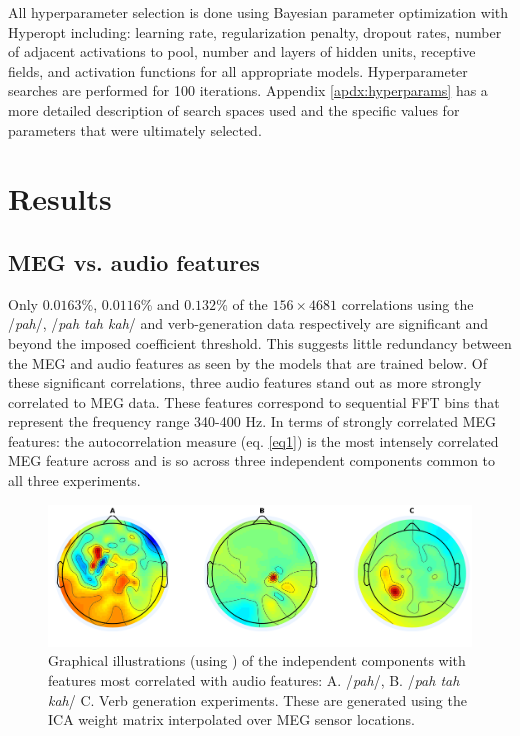 \documentclass[utf8]{frontiersSCNS} %
\begin{document}
All hyperparameter selection is done using Bayesian parameter optimization with Hyperopt \cite{Bergstra2013} including: learning rate, regularization penalty, dropout rates, number of adjacent activations to pool, number and layers of hidden units, receptive fields, and activation functions for all appropriate models. Hyperparameter searches are performed for 100 iterations. Appendix \ref{apdx:hyperparams} has a more detailed description of search spaces used and the specific values for parameters that were ultimately selected.

\section{Results}

\subsection{MEG vs. audio features}

Only $0.0163$\%, $0.0116$\% and $0.132$\% of the $156 \times 4681$ correlations using the /{\em pah}/, /{\em pah tah kah}/ and verb-generation data respectively are significant and beyond the imposed coefficient threshold. This suggests little redundancy between the MEG and audio features as seen by the models that are trained below. Of these significant correlations, three audio features stand out as more strongly correlated to MEG data. These features correspond to sequential FFT bins that represent the frequency range 340-400 Hz. In terms of strongly correlated MEG features: the autocorrelation measure (eq. \ref{eq1}) is the most intensely correlated MEG feature across and is so across three independent components common to all three experiments.

\begin{figure}[htp]
  \centering
  \includegraphics[width=\linewidth]{AllComponents.png}
  \caption{Graphical illustrations (using \cite{Delorme04eeglab}) of the independent components with features most correlated with audio features: A. /{\em pah}/, B. /{\em pah tah kah}/ C. Verb generation experiments. These are generated using the ICA weight matrix interpolated over MEG sensor locations.}
  \label{fig:components}
\end{figure}
 
\end{document}
